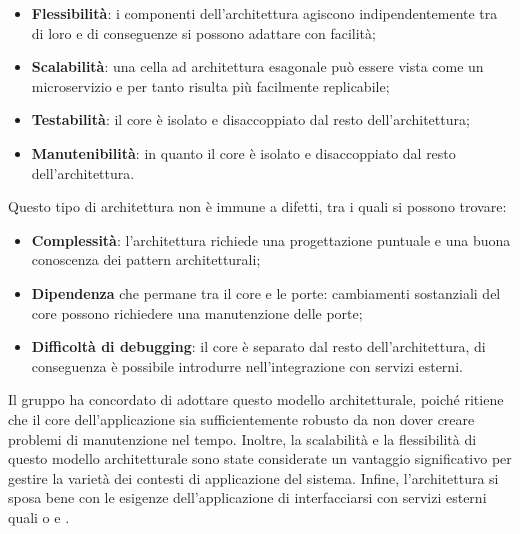 \begin{itemize}
    \item \textbf{Flessibilità}: i componenti dell'architettura agiscono indipendentemente tra di loro e di conseguenze si possono adattare con facilità;
    \item \textbf{Scalabilità}: una cella ad architettura esagonale può essere vista come un microservizio e per tanto risulta più facilmente replicabile;
    \item \textbf{Testabilità}: il core è isolato e disaccoppiato dal resto dell'architettura;
    \item \textbf{Manutenibilità}: in quanto il core è isolato e disaccoppiato dal resto dell'architettura.
\end{itemize}
\vspace{0.5\baselineskip}
\par Questo tipo di architettura non è immune a difetti, tra i quali si possono trovare:
\begin{itemize}
    \item \textbf{Complessità}: l'architettura richiede una progettazione puntuale e una buona conoscenza dei pattern architetturali;
    \item \textbf{Dipendenza} che permane tra il core e le porte: cambiamenti sostanziali del core possono richiedere una manutenzione delle porte;
    \item \textbf{Difficoltà di debugging}: il core è separato dal resto dell'architettura, di conseguenza è possibile introdurre  nell'integrazione con servizi esterni.
\end{itemize}

\vspace{0.5\baselineskip}
\par Il gruppo ha concordato di adottare questo modello architetturale, poiché ritiene che il core dell'applicazione sia sufficientemente robusto da non dover creare problemi di manutenzione nel tempo. Inoltre, la scalabilità e la flessibilità di questo modello architetturale sono state considerate un vantaggio significativo per gestire la varietà dei contesti di applicazione del sistema. Infine, l'architettura si sposa bene con le esigenze dell'applicazione di interfacciarsi con servizi esterni quali  o  e .